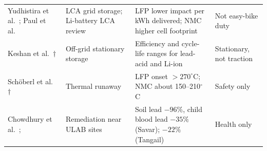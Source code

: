 \begin{table}[t]
\begin{tabularx}{\textwidth}{>{\raggedright\arraybackslash}p{3.1cm}>{\raggedright\arraybackslash}p{3.3cm}>{\raggedright\arraybackslash}X>{\raggedright\arraybackslash}p{3.4cm}}
Yudhistira et al.\ \citep{yudhistira2022}; Paul et al.\ \citep{paul2024} & LCA grid storage; Li-battery LCA review & LFP lower impact per kWh delivered; NMC higher cell footprint & Not easy-bike duty \\
Keshan et al.\ \citep{keshan2016}$\dagger$ & Off-grid stationary storage & Efficiency and cycle-life ranges for lead-acid and Li-ion & Stationary, not traction \\
Sch\"oberl et al.\ \citep{schoberl2024}$\dagger$ & Thermal runaway & LFP onset $>270^\circ$C; NMC about 150--210$^\circ$C & Safety only \\
Chowdhury et al.\ \citep{chowdhury2021}; \citep{eos2026} & Remediation near ULAB sites & Soil lead $-96\%$, child blood lead $-35\%$ (Savar); $-22\%$ (Tangail) & Health only \\
\bottomrule
\end{tabularx}
\end{table}

